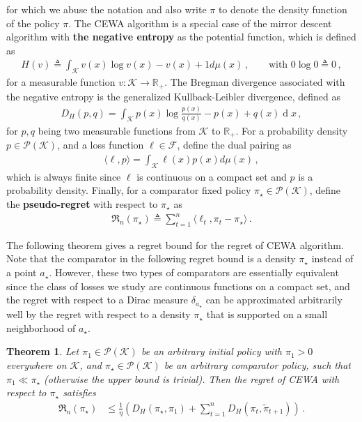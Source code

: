 \documentclass{article}
\theoremstyle{plain}
\newtheorem{theorem}{Theorem}
\theoremstyle{definition}
\theoremstyle{plain}
\newcommand{\R}{\mathbb R}
\newcommand{\Reg}{\mathfrak{R}}
\newcommand{\K}{\mathcal K}
\newcommand{\cF}{\mathcal F}
\newcommand{\cP}{\mathcal P}
\renewcommand{\d}[1]{\operatorname{d}\!#1}
\newcommand{\cewaalg}{\textsf{CEWA}\xspace}
\begin{document}
for which we abuse the notation and also write $\pi$ to denote the density function of the policy $\pi$.
The \cewaalg algorithm is a special case of the mirror descent algorithm with \textbf{the negative entropy} as the potential function, which is defined as
\begin{align}
    H(v) \triangleq \int_{\K} v(x) \log v(x) - v(x) + 1 d\mu(x)\,, \qquad \text{with } 0\log 0 \triangleq 0\,,
\end{align}
for a measurable function $v:\K \to \R_+$.
The Bregman divergence associated with the negative entropy is the generalized Kullback-Leibler divergence, defined as
\begin{align}
    D_H(p,q)
    =
    \int_\K p(x)\log\frac{p(x)}{q(x)} - p(x) + q(x)\d x\,,
\end{align}
for $p,q$ being two measurable functions from $\K$ to $\R_+$.
For a probability density $p \in \cP(\K)$, and a loss function $\ell \in \cF$, define the dual pairing as
\begin{align}
    \langle \ell, p \rangle
    =
    \int_\K \ell(x) p(x) d\mu(x)\,,
\end{align}
which is always finite since $\ell$ is continuous on a compact set and $p$ is a probability density.
Finally, for a comparator fixed policy $\pi_\star \in \cP(\K)$, define the \textbf{pseudo-regret} with respect to $\pi_\star$ as
\begin{align}
    \Reg_n(\pi_\star) \triangleq
    \sum_{t=1}^{n} \langle \ell_t, \pi_t - \pi_\star \rangle\,.
\end{align}

The following theorem gives a regret bound for the regret of \cewaalg algorithm.
Note that the comparator in the following regret bound is a density $\pi_\star$ instead of a point $a_\star$.
However, these two types of comparators are essentially equivalent since the class of losses we study are continuous functions on a compact set, and the regret with respect to a Dirac measure $\delta_{a_\star}$ can be approximated arbitrarily well by the regret with respect to a density $\pi_\star$ that is supported on a small neighborhood of $a_\star$.
\begin{theorem}\label{thm:MD}
    Let $\pi_1 \in \cP(\K)$ be an arbitrary initial policy with $\pi_1>0$ everywhere on $\K$,
    and $\pi_\star \in \cP(\K)$ be an arbitrary comparator policy,
    such that $\pi_1 \ll \pi_\star$ (otherwise the upper bound is trivial).
    Then the regret of \cewaalg with respect to $\pi_\star$ satisfies
    \begin{align}
        \Reg_n(\pi_\star)
         & \leq
        \frac{1}{\eta}
        \left(
        D_H(\pi_\star, \pi_1)
        +
        \sum_{t=1}^{n} D_H(\pi_t, \tilde{\pi}_{t+1})
        \right)\,.
    \end{align}
\end{theorem}
\end{document}
